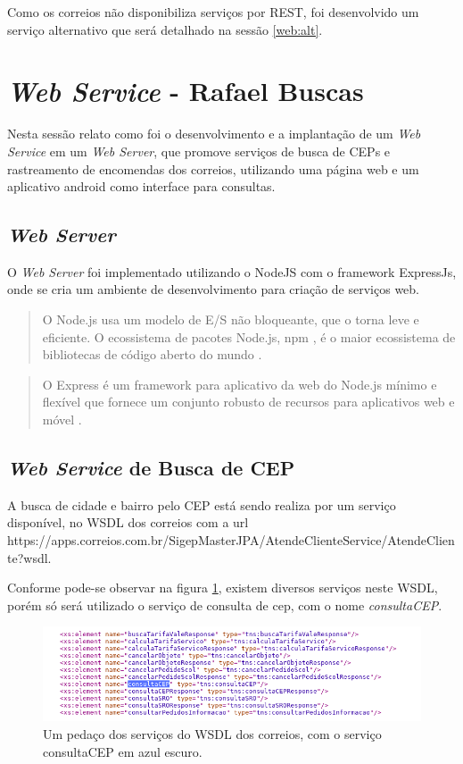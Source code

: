 \documentclass[a4paper, 12pt]{article}
\begin{document}
Como os correios não disponibiliza serviços por REST, foi desenvolvido um serviço alternativo  que será detalhado na sessão \ref{web:alt}.  

\section{\textit{Web Service} - Rafael Buscas }
Nesta sessão relato como foi o desenvolvimento e a implantação de um \textit{Web Service} em um \textit{Web Server}, que promove serviços de busca de CEPs e rastreamento de encomendas dos correios, utilizando uma página web e um aplicativo android como interface para consultas.

\subsection{\textit{Web Server}}
O \textit{Web Server} foi implementado utilizando o NodeJS com o framework ExpressJs, onde se cria um ambiente de desenvolvimento para criação de serviços web.
\begin{quote}
	O Node.js usa um modelo de E/S não bloqueante, que o torna leve e eficiente. O ecossistema de pacotes Node.js, npm , é o maior ecossistema de bibliotecas de código aberto do mundo \cite{nodejs}.
\end{quote}
\begin{quote}
	O Express é um framework para aplicativo da web do Node.js mínimo e flexível que fornece um conjunto robusto de recursos para aplicativos web e móvel \cite{expressjs}.
\end{quote}

\subsection{\textit{Web Service} de Busca de CEP}\label{web:cep}
A busca de cidade e bairro pelo CEP está sendo realiza por um serviço disponível, no WSDL dos 
correios com a url https://apps.correios.com.br/SigepMasterJPA/AtendeClienteService/AtendeCliente?wsdl.

Conforme pode-se observar na figura \ref{c33}, existem diversos serviços neste WSDL, porém só será utilizado o serviço de consulta de cep, com o nome \textit{consultaCEP}.

\begin{figure}[H]
	\centering
	\includegraphics[scale=0.58]{Imagens/wsdlcep.png}
	\caption{Um pedaço dos serviços do WSDL dos correios, com o serviço consultaCEP em azul escuro.}
	\label{c33}
\end{figure}
\end{document}

